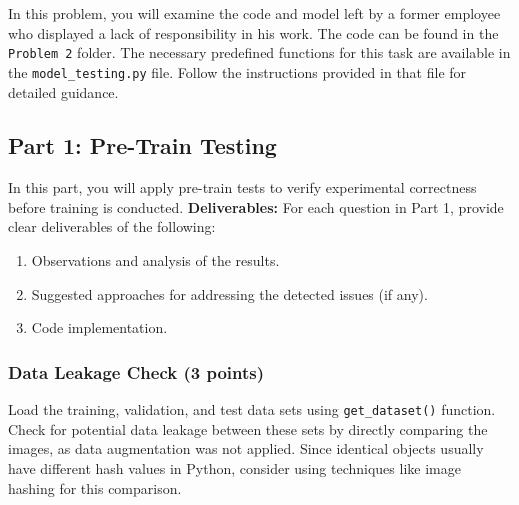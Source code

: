 \documentclass[11pt, oneside]{article}   	%
\begin{document}
In this problem, you will examine the code and model left by a former employee who displayed a lack of responsibility in his work. The code can be found in the \texttt{Problem 2} folder. The necessary predefined functions for this task are available in the \texttt{model\_testing.py} file. Follow the instructions provided in that file for detailed guidance.

\subsection*{Part 1: Pre-Train Testing}

In this part, you will apply pre-train tests to verify experimental correctness before training is conducted. \noindent\textbf{Deliverables:} For each question in Part 1, provide clear deliverables of the following:
\begin{enumerate}
    \item Observations and analysis of the results.
    \item Suggested approaches for addressing the detected issues (if any).
    \item Code implementation.
\end{enumerate}

\subsubsection*{Data Leakage Check (3 points)}
Load the training, validation, and test data sets using \texttt{get\_dataset()} function. Check for potential data leakage between these sets by directly comparing the images, as data augmentation was not applied. Since identical objects usually have different hash values in Python, consider using techniques like image hashing for this comparison.
\end{document}

